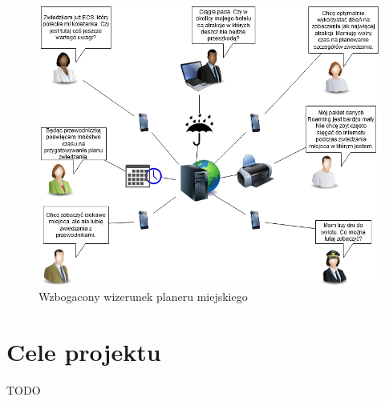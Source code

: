 \begin{figure}[h]
    \centering
    \includegraphics[width=1\textwidth]{attachments/rich-picture}
    \caption{Wzbogacony wizerunek planeru miejskiego}
    \label{fig:rich-picture}
\end{figure}

\section{Cele projektu}
\label{sec:cele-projektu}

TODO
